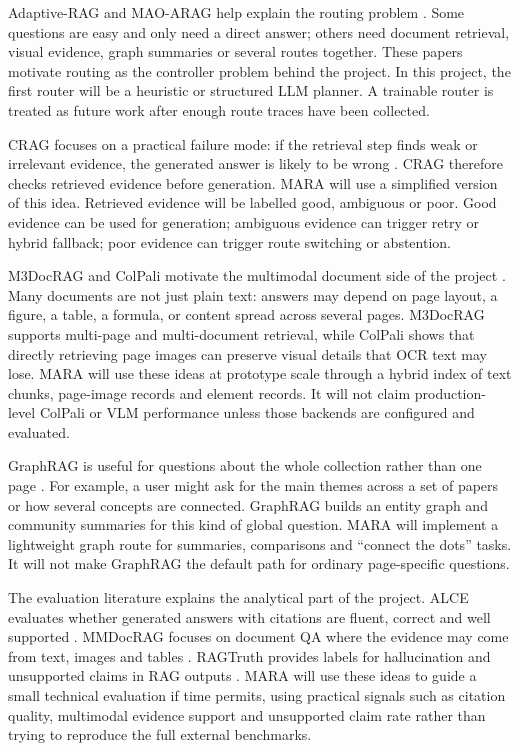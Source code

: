 \documentclass{article}
\begin{document}
Adaptive-RAG and MAO-ARAG help explain the routing problem \cite{jeong2024adaptiverag, chen2025maoarag}. Some questions are easy and only need a direct answer; others need document retrieval, visual evidence, graph summaries or several routes together. These papers motivate routing as the controller problem behind the project. In this project, the first router will be a heuristic or structured LLM planner. A trainable router is treated as future work after enough route traces have been collected.

CRAG focuses on a practical failure mode: if the retrieval step finds weak or irrelevant evidence, the generated answer is likely to be wrong \cite{yan2024crag}. CRAG therefore checks retrieved evidence before generation. MARA will use a simplified version of this idea. Retrieved evidence will be labelled good, ambiguous or poor. Good evidence can be used for generation; ambiguous evidence can trigger retry or hybrid fallback; poor evidence can trigger route switching or abstention.

M3DocRAG and ColPali motivate the multimodal document side of the project \cite{cho2024m3docrag, faysse2024colpali}. Many documents are not just plain text: answers may depend on page layout, a figure, a table, a formula, or content spread across several pages. M3DocRAG supports multi-page and multi-document retrieval, while ColPali shows that directly retrieving page images can preserve visual details that OCR text may lose. MARA will use these ideas at prototype scale through a hybrid index of text chunks, page-image records and element records. It will not claim production-level ColPali or VLM performance unless those backends are configured and evaluated.

GraphRAG is useful for questions about the whole collection rather than one page \cite{edge2024graphrag}. For example, a user might ask for the main themes across a set of papers or how several concepts are connected. GraphRAG builds an entity graph and community summaries for this kind of global question. MARA will implement a lightweight graph route for summaries, comparisons and ``connect the dots'' tasks. It will not make GraphRAG the default path for ordinary page-specific questions.

The evaluation literature explains the analytical part of the project. ALCE evaluates whether generated answers with citations are fluent, correct and well supported \cite{gao2023alce}. MMDocRAG focuses on document QA where the evidence may come from text, images and tables \cite{dong2025mmdocrag}. RAGTruth provides labels for hallucination and unsupported claims in RAG outputs \cite{niu2024ragtruth}. MARA will use these ideas to guide a small technical evaluation if time permits, using practical signals such as citation quality, multimodal evidence support and unsupported claim rate rather than trying to reproduce the full external benchmarks.
\end{document}
